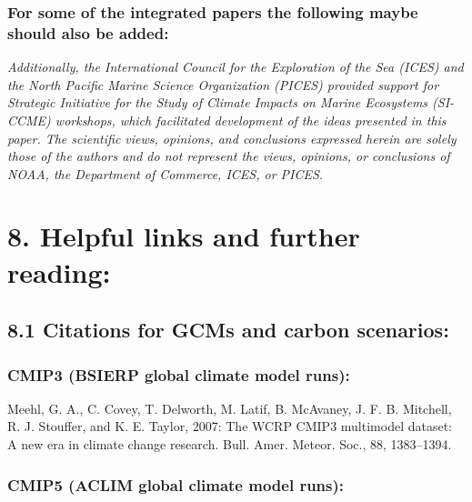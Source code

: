 \documentclass[
]{article}
\begin{document}
\hypertarget{for-some-of-the-integrated-papers-the-following-maybe-should-also-be-added}{%
\subsubsection{For some of the integrated papers the following maybe
should also be
added:}\label{for-some-of-the-integrated-papers-the-following-maybe-should-also-be-added}}

\emph{Additionally, the International Council for the Exploration of the
Sea (ICES) and the North Pacific Marine Science Organization (PICES)
provided support for Strategic Initiative for the Study of Climate
Impacts on Marine Ecosystems (SI-CCME) workshops, which facilitated
development of the ideas presented in this paper. The scientific views,
opinions, and conclusions expressed herein are solely those of the
authors and do not represent the views, opinions, or conclusions of
NOAA, the Department of Commerce, ICES, or PICES.}

\hypertarget{helpful-links-and-further-reading}{%
\section{8. Helpful links and further
reading:}\label{helpful-links-and-further-reading}}

\hypertarget{citations-for-gcms-and-carbon-scenarios}{%
\subsection{8.1 Citations for GCMs and carbon
scenarios:}\label{citations-for-gcms-and-carbon-scenarios}}

\hypertarget{cmip3-bsierp-global-climate-model-runs}{%
\subsubsection{CMIP3 (BSIERP global climate model
runs):}\label{cmip3-bsierp-global-climate-model-runs}}

Meehl, G. A., C. Covey, T. Delworth, M. Latif, B. McAvaney, J. F. B.
Mitchell, R. J. Stouffer, and K. E. Taylor, 2007: The WCRP CMIP3
multimodel dataset: A new era in climate change research. Bull. Amer.
Meteor. Soc., 88, 1383--1394.

\hypertarget{cmip5-aclim-global-climate-model-runs}{%
\subsubsection{CMIP5 (ACLIM global climate model
runs):}\label{cmip5-aclim-global-climate-model-runs}}
\end{document}
